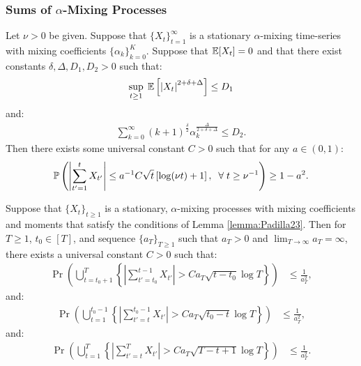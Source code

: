 \subsubsection{Sums of $\alpha$-Mixing Processes}

\begin{lemma}\label{lemma:Padilla23}
Let $\nu > 0$ be given. Suppose that $\{X_t\}_{t=1}^\infty$ is a stationary $\alpha$-mixing time-series with mixing coefficients $\{\alpha_k\}_{k=0}^K$. Suppose that $\mathbb{E}[X_t] = 0$ and that there exist constants $\delta, \Delta, D_1, D_2 > 0$ such that:
\begin{align*}
    \sup_{t \geq 1}\; \mathbb{E}\left[\left|X_t\right|^{2+\delta+\Delta}\right] \leq D_1 
\end{align*}
and:
\begin{align*}
    \sum_{k=0}^\infty (k+1)^{\frac{\delta}{2}} \alpha_k^{\frac{\Delta}{2+\delta+\Delta}} \leq D_2.
\end{align*}
Then there exists some universal constant $C > 0$ such that for any $a \in (0,1)$:
\begin{align*}
    \mathbb{P} \left(\left|\sum_{t'=1}^t X_{t'}\right| \leq a^{-1}C\sqrt{t}\left[\log (\nu t) + 1\right], \;\;\forall\; t\geq \nu^{-1}\right) 
    \geq 1 - a^2.
\end{align*}

\end{lemma}

\begin{lemma}\label{lemma:alpha-mix-sum}
Suppose that $\{X_t\}_{t\geq 1}$ is a stationary, $\alpha$-mixing processes with mixing coefficients and moments that satisfy the conditions of Lemma \ref{lemma:Padilla23}. Then for $T \geq 1$, $t_0 \in [T]$, and sequence $\{a_T\}_{T\geq 1}$ such that $a_T > 0$ and $\lim_{T\to\infty} a_T = \infty$, there exists a universal constant $C > 0$ such that:
\begin{align*}
    \Pr \left(\bigcup_{t=t_0 + 1}^{T}\left\{ \left|\sum_{t'=t_0}^{t-1} X_{t'}\right| > Ca_T\sqrt{t-t_0}\log T\right\}\right) 
    &\leq \frac{1}{a_T^2},
\end{align*}
and:
\begin{align*}
    \Pr \left(\bigcup_{t=1}^{t_0-1}\left\{ \left|\sum_{t'=t}^{t_0-1} X_{t'}\right| > Ca_T\sqrt{t_0-t}\log T\right\}\right) 
    &\leq \frac{1}{a^2_T},
\end{align*}
and:
\begin{align*}
    \Pr \left(\bigcup_{t=1}^{T}\left\{ \left|\sum_{t'=t}^{T} X_{t'}\right| > Ca_T\sqrt{T-t+1}\log T\right\}\right) 
    &\leq \frac{1}{a_T^2}.
\end{align*}

\end{lemma}

